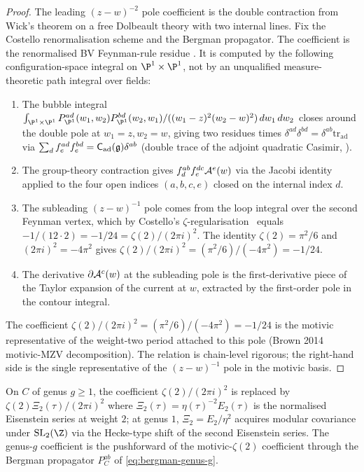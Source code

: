 \begin{proof}
The leading $(z-w)^{-2}$ pole coefficient is the double contraction
from Wick's theorem on a free Dolbeault theory with two internal lines.
Fix the Costello renormalisation scheme and the Bergman propagator.
The coefficient is the renormalised BV Feynman-rule residue
\cite[\S11]{CostelloRenormalization}.  It is computed by the following
configuration-space integral on $\P^1\times\P^1$, not by an
unqualified measure-theoretic path integral over fields:
\begin{enumerate}[label=\textup{(\arabic*)}]
\item
The bubble integral
$\int_{\P^1\times\P^1}
P^{ad}_{\P^1}(w_1,w_2)P^{bd}_{\P^1}(w_2,w_1)/((w_1-z)^2(w_2-w)^2)
\,dw_1\,dw_2$
closes around the double pole at $w_1 = z, w_2 = w$, giving two residues
times $\delta^{ad}\delta^{bd} = \delta^{ab}\mathrm{tr}_{\mathrm{ad}}$ via
$\sum_d f^{ad}_e f^{bd}_e = \mathsf C_{\mathrm{ad}}(\mathfrak{g})\delta^{ab}$
(double trace of the adjoint quadratic Casimir,
\cite[\S2]{KacInfDim}).
\item
The group-theory contraction gives
$f^{ab}_d f^{dc}_e\mathcal{A}^e(w)$ via the Jacobi identity applied to the
four open indices $(a,b,c,e)$ closed on the internal index $d$.
\item
The subleading $(z-w)^{-1}$ pole comes from the loop integral over the
second Feynman vertex, which by Costello's
$\zeta$-regularisation~\cite[\S10]{CostelloRenormalization} equals
$-1/(12\cdot 2) = -1/24 = \zeta(2)/(2\pi i)^2$. The identity
$\zeta(2) = \pi^2/6$ and $(2\pi i)^2 = -4\pi^2$ gives
$\zeta(2)/(2\pi i)^2 = (\pi^2/6)/(-4\pi^2) = -1/24$.
\item
The derivative $\partial\mathcal{A}^c(w)$ at the subleading pole is the
first-derivative piece of the Taylor expansion of the current at $w$,
extracted by the first-order pole in the contour integral.
\end{enumerate}
The coefficient $\zeta(2)/(2\pi i)^2 = (\pi^2/6)/(-4\pi^2) = -1/24$ is
the motivic representative of the weight-two period attached to this
pole (Brown 2014 motivic-MZV decomposition). The relation is
chain-level rigorous; the right-hand side is the single representative
of the $(z-w)^{-1}$ pole in the motivic basis.
\end{proof}

\begin{remark}
\label{rem:ch-ce-oneloop-higher-genus}
On $C$ of genus $g\ge 1$, the coefficient $\zeta(2)/(2\pi i)^2$ is
replaced by $\zeta(2)\Xi_2(\tau)/(2\pi i)^2$ where
$\Xi_2(\tau) = \eta(\tau)^{-2}E_2(\tau)$ is the normalised Eisenstein
series at weight $2$; at genus $1$, $\Xi_2 = E_2/\eta^2$ acquires
modular covariance under $\mathrm{SL}_2(\Z)$ via the Hecke-type shift
of the second Eisenstein series. The genus-$g$ coefficient is the
pushforward of the motivic-$\zeta(2)$ coefficient through the
Bergman propagator $P^{ab}_C$ of \eqref{eq:bergman-genus-g}.
\end{remark}

